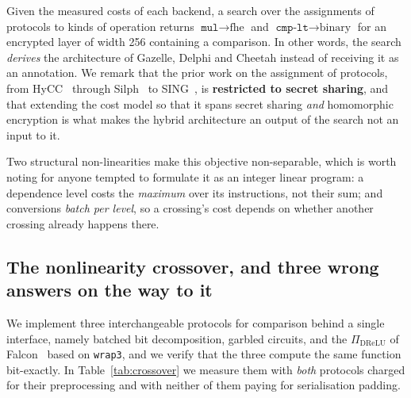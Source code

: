 \documentclass[11pt]{article}
\newcommand{\bt}[1]{\texttt{#1}}
\begin{document}
Given the measured costs of each backend, a search over the assignments of protocols to
kinds of operation returns $\bt{mul}\to\text{fhe}$ and $\bt{cmp-lt}\to\text{binary}$ for an
encrypted layer of width 256 containing a comparison. In other words, the search \emph{derives}
the architecture of Gazelle, Delphi and Cheetah instead of receiving it as an annotation. We
remark that the prior work on the assignment of protocols, from HyCC~\cite{HyCC} through
Silph~\cite{Silph} to SING~\cite{SING}, is \textbf{restricted to secret sharing}, and that
extending the cost model so that it spans secret sharing \emph{and} homomorphic encryption is
what makes the hybrid architecture an output of the search not an input to it.

Two structural non-linearities make this objective non-separable, which is worth
noting for anyone tempted to formulate it as an integer linear program: a
dependence level costs the \emph{maximum} over its instructions, not their sum;
and conversions \emph{batch per level}, so a crossing's cost depends on whether
another crossing already happens there.

\subsection{The nonlinearity crossover, and three wrong answers on the way to it}
\label{sec:crossover-nonlin}

We implement three interchangeable protocols for comparison behind a single interface,
namely batched bit decomposition, garbled circuits, and the $\Pi_{\mathrm{DReLU}}$ of
Falcon~\cite{Falcon} based on \bt{wrap3}, and we verify that the three compute the same function
bit-exactly. In Table~\ref{tab:crossover} we measure them with \emph{both} protocols charged for
their preprocessing and with neither of them paying for serialisation padding.
\end{document}
